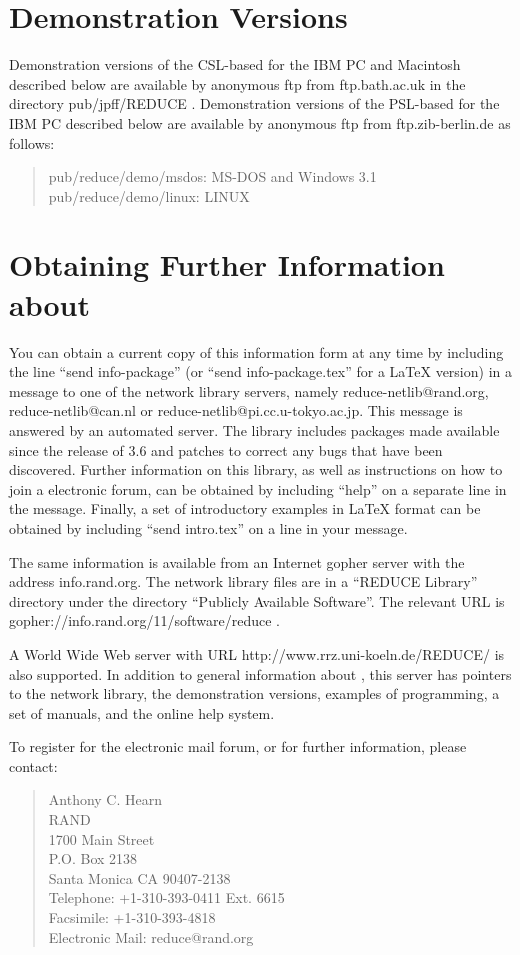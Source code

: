 \section*{Demonstration Versions}
Demonstration versions of the CSL-based {\REDUCE} for the IBM PC and
Macintosh described below are available by anonymous ftp from
ftp.bath.ac.uk in the directory pub/jpff/REDUCE .
\newpage
Demonstration versions of the PSL-based {\REDUCE} for the IBM PC described
below are available by anonymous ftp from ftp.zib-berlin.de as follows:
\begin{quote}
pub/reduce/demo/msdos:    MS-DOS and Windows 3.1 \\
pub/reduce/demo/linux:    LINUX
\end{quote}

\section*{Obtaining Further Information about {\REDUCE}}
You can obtain a current copy of this information form at any time by
including the line ``send info-package'' (or ``send info-package.tex'' for
a {\LaTeX} version) in a message to one of the {\REDUCE} network library
servers, namely reduce-netlib@rand.org, reduce-netlib@can.nl or
reduce-netlib@pi.cc.u-tokyo.ac.jp.  This message is answered by an
automated server.  The library includes packages made available since the
release of {\REDUCE} 3.6 and patches to correct any bugs that have been
discovered.  Further information on this library, as well as instructions
on how to join a {\REDUCE} electronic forum, can be obtained by including
``help'' on a separate line in the message.  Finally, a set of
introductory examples in {\LaTeX} format can be obtained by including
``send intro.tex'' on a line in your message.

The same information is available from an Internet gopher server with
the address info.rand.org.  The network library files are in a ``REDUCE
Library'' directory under the directory ``Publicly Available Software''.
The relevant URL is gopher://info.rand.org/11/software/reduce .

A World Wide Web {\REDUCE} server with URL http://www.rrz.uni-koeln.de/REDUCE/
is also supported.  In addition to general information about {\REDUCE}, this
server has pointers to the network library, the demonstration versions,
examples of {\REDUCE} programming, a set of manuals, and the {\REDUCE} online
help system.

To register for the electronic mail forum, or for further information,
please contact:
\begin{quote}
Anthony C. Hearn \\
RAND \\
1700 Main Street \\
P.O. Box 2138 \\
Santa Monica CA 90407-2138 \\
Telephone: +1-310-393-0411 Ext. 6615 \\
Facsimile: +1-310-393-4818 \\
Electronic Mail: reduce@rand.org
\end{quote}

